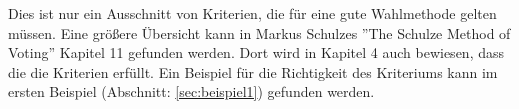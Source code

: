 Dies ist nur ein Ausschnitt von Kriterien, die für eine gute Wahlmethode gelten müssen. Eine größere Übersicht kann in Markus Schulzes ''The Schulze Method
of Voting'' \citep{Schulze2018} Kapitel 11 gefunden werden. Dort wird in Kapitel 4 auch bewiesen, dass die \schulze die Kriterien erfüllt. Ein Beispiel für die Richtigkeit des \condorcet Kriteriums kann im ersten Beispiel (Abschnitt: \ref{sec:beispiel1})  gefunden werden.



